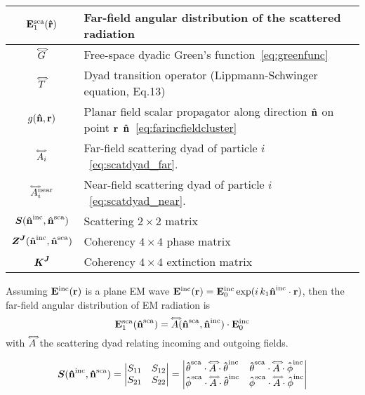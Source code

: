 \begin{table}[]
\begin{tabular}{cl}
$\ScaEField_1(\dpx)$ & Far-field angular distribution of the scattered radiation  \\

\hline
$\sGreen$ & Free-space dyadic Green's function~\eqref{eq:greenfunc} \\
$\dyad{T}$ & Dyad transition operator (Lippmann-Schwinger equation, Eq.13) \\
$\sGreenProp(\dw,\px)$ & Planar field scalar propagator along direction $\dw$ on point $\px$ $\dw$~\eqref{eq:farincfieldcluster} \\
\hline
$\ScaDyad_i$ & Far-field scattering dyad of particle $i$~\eqref{eq:scatdyad_far}. \\
$\ScaDyad_i^\text{near}$ & Near-field scattering dyad of particle $i$~\eqref{eq:scatdyad_near}. \\
$\ScaMatrix(\dwi,\dws)$ & Scattering $2\times2$ matrix  \\
$\PhaseMatrix(\dwi,\dws)$ & Coherency $4\times4$ phase matrix \\
$\ExtMatrix$ & Coherency $4\times 4$ extinction matrix \\
\end{tabular}
\end{table}


Assuming $\IncEField(\px)$ is a plane EM wave  $\IncEField(\px)=\IncEField_0 \exp(i\,k_1 \dwi\cdot \px)$, then the far-field angular distribution of EM radiation is 
\begin{equation}
\ScaEField_1(\dws) = \dyad{A}(\dws,\dwi) \cdot \IncEField_0
\end{equation}
with $\dyad{A}$ the scattering dyad relating incoming and outgoing fields. 

\begin{equation}
\ScaMatrix(\dwi,\dws) =\begin{vmatrix}
S_{11} & S_{12}\\ 
S_{21} & S_{22} 
\end{vmatrix} 
=\begin{vmatrix}
\dwsc^{\text{sca}}\cdot\dyad{A}\cdot \dwsc^{\text{inc}} & \dwsc^{\text{sca}}\cdot\dyad{A}\cdot \dwpc^{\text{inc}} \\ 
\dwpc^{\text{sca}}\cdot\dyad{A}\cdot \dwsc^{\text{inc}} & \dwpc^{\text{sca}}\cdot\dyad{A}\cdot \dwpc^{\text{inc}}
\end{vmatrix} 
\end{equation}


